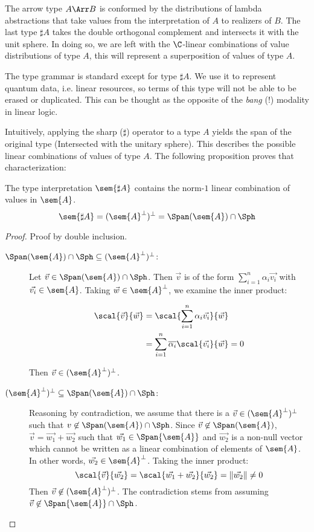 The arrow type $A\Arr B$ is conformed by the distributions of lambda abstractions that take values from the interpretation of $A$ to realizers of $B$. The last type $\sharp A$ takes the double orthogonal complement and intersects it with the unit sphere. In doing so, we are left with the $\C$-linear combinations of value distributions of type $A$, this will represent a superposition of values of type $A$.

The type grammar is standard except for type $\sharp A$. We use it to represent quantum data, i.e. linear resources, so terms of this type will not be able to be erased or duplicated. This can be thought as the opposite of the \textit{bang} ($!$) modality in linear logic. 

Intuitively, applying the sharp ($\sharp$) operator to a type $A$ yields the span of the original type (Intersected with the unitary sphere). This describes the possible linear combinations of values of type $A$. The following proposition proves that characterization:

\begin{proposition}\label{prop:SharpCharacterization}
  The type interpretation $\sem{\sharp A}$ contains the norm-$1$ linear combination of values in $\sem{A}$.
  \[
  \sem{\sharp A} = (\sem{A}^\bot)^\bot = \Span(\sem{A})\cap\Sph
  \]
\end{proposition}

\begin{proof}
  Proof by double inclusion.
  \begin{description}
    \item[$\Span(\sem{A})\cap\Sph\subseteq (\sem{A}^\bot)^\bot$:] Let $\vec{v}\in\Span(\sem{A})\cap\Sph$. Then $\vec{v}$ is of the form $\sum_{i=1}^{n}\alpha_i \vec{v_i}$ with $\vec{v_i}\in\sem{A}$. Taking $\vec{w}\in\sem{A}^\bot$, we examine the inner product:
    
    \begin{align*}
    \scal{\vec{v}}{\vec{w}} &= \scal{\sum_{i=1}^{n}\alpha_i \vec{v_i}}{\vec{w}}\\
    &= \sum_{i=1}^{n}\overline{\alpha_i}\scal{\vec{v_i}}{\vec{w}}=0
    \end{align*}

    Then $\vec{v}\in(\sem{A}^\bot)^\bot$.

    \item[$(\sem{A}^\bot)^\bot\subseteq \Span(\sem{A})\cap\Sph$:] Reasoning by contradiction, we assume that there is a $\vec{v}\in(\sem{A}^\bot)^\bot$ such that $v\not\in\Span(\sem{A})\cap\Sph$. Since $\vec{v}\not\in\Span(\sem{A})$, $\vec{v}=\vec{w_1} + \vec{w_2}$ such that $\vec{w_1}\in\Span{\sem{A}}$ and $\vec{w_2}$ is a non-null vector which cannot be written as a linear combination of elements of $\sem{A}$. In other words, $\vec{w_2}\in\sem{A}^\bot$. Taking the inner product:
    \[
    \scal{\vec{v}}{\vec{w_2}} = \scal{\vec{w_1}+\vec{w_2}}{\vec{w_2}} = \|\vec{w_2}\|\neq 0
    \]
    Then $\vec{v}\not\in(\sem{A}^\bot)^\bot$. The contradiction stems from assuming $\vec{v}\not\in\Span{\sem{A}}\cap\Sph$.
  \end{description}
\end{proof}

